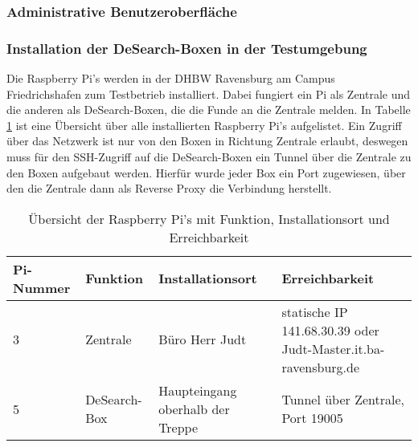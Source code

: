 \subsubsection{Administrative Benutzeroberfläche}
\subsubsection{Installation der DeSearch-Boxen in der Testumgebung}
Die Raspberry Pi's werden in der DHBW Ravensburg am Campus Friedrichshafen zum Testbetrieb installiert. Dabei fungiert ein Pi als Zentrale und die anderen als DeSearch-Boxen, die die Funde an die Zentrale melden. In Tabelle \ref{tab:pis} ist eine Übersicht über alle installierten Raspberry Pi's aufgelistet. Ein Zugriff über das Netzwerk ist nur von den Boxen in Richtung Zentrale erlaubt, deswegen muss für den SSH-Zugriff auf die DeSearch-Boxen ein Tunnel über die Zentrale zu den Boxen aufgebaut werden. Hierfür wurde jeder Box ein Port zugewiesen, über den die Zentrale dann als Reverse Proxy die Verbindung herstellt.
\begin{table}[h]
	\begin{tabular}{ | p{} | p{} | p{4cm} | p{6cm} |}
		\hline
		\textbf{Pi-Nummer} & \textbf{Funktion} & \textbf{Installationsort} &  \textbf{Erreichbarkeit} \\ \hline
		3 & Zentrale & Büro Herr Judt & statische IP 141.68.30.39 oder \mbox{Judt-Master.it.ba-ravensburg.de} \\ \hline
		5 & DeSearch-Box & Haupteingang oberhalb der Treppe & Tunnel über Zentrale, Port 19005 \\ \hline
		
	\end{tabular}
	\caption{Übersicht der Raspberry Pi's mit Funktion, Installationsort und Erreichbarkeit}
	\label{tab:pis}
	
\end{table}
